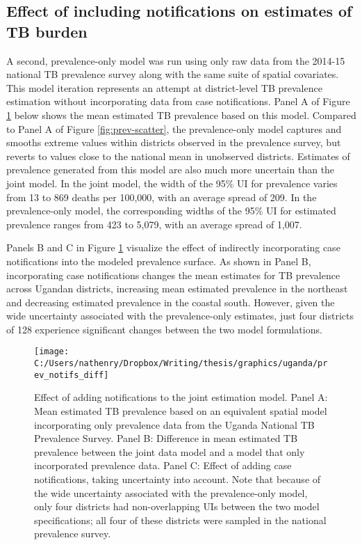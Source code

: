 \documentclass[
]{article}
\begin{document}
\hypertarget{effect-of-including-notifications-on-estimates-of-tb-burden}{%
\subsection{Effect of including notifications on estimates of TB burden}\label{effect-of-including-notifications-on-estimates-of-tb-burden}}

A second, prevalence-only model was run using only raw data from the 2014-15 national TB prevalence survey along with the same suite of spatial covariates. This model iteration represents an attempt at district-level TB prevalence estimation without incorporating data from case notifications. Panel A of Figure \ref{fig:prev-notifs-diff} below shows the mean estimated TB prevalence based on this model. Compared to Panel A of Figure \ref{fig:prev-scatter}, the prevalence-only model captures and smooths extreme values within districts observed in the prevalence survey, but reverts to values close to the national mean in unobserved districts. Estimates of prevalence generated from this model are also much more uncertain than the joint model. In the joint model, the width of the 95\% UI for prevalence varies from 13 to 869 deaths per 100,000, with an average spread of 209. In the prevalence-only model, the corresponding widths of the 95\% UI for estimated prevalence ranges from 423 to 5,079, with an average spread of 1,007.

Panels B and C in Figure \ref{fig:prev-notifs-diff} visualize the effect of indirectly incorporating case notifications into the modeled prevalence surface. As shown in Panel B, incorporating case notifications changes the mean estimates for TB prevalence across Ugandan districts, increasing mean estimated prevalence in the northeast and decreasing estimated prevalence in the coastal south. However, given the wide uncertainty associated with the prevalence-only estimates, just four districts of 128 experience significant changes between the two model formulations.

\begin{figure}[!ht]

{\centering \texttt{[image: C:/Users/nathenry/Dropbox/Writing/thesis/graphics/uganda/prev\_notifs\_diff]} 

}

\caption{Effect of adding notifications to the joint estimation model. Panel A: Mean estimated TB prevalence based on an equivalent spatial model incorporating only prevalence data from the Uganda National TB Prevalence Survey. Panel B: Difference in mean estimated TB prevalence between the joint data model and a model that only incorporated prevalence data. Panel C: Effect of adding case notifications, taking uncertainty into account. Note that because of the wide uncertainty associated with the prevalence-only model, only four districts had non-overlapping UIs between the two model specifications; all four of these districts were sampled in the national prevalence survey.}\label{fig:prev-notifs-diff}
\end{figure}
\end{document}
